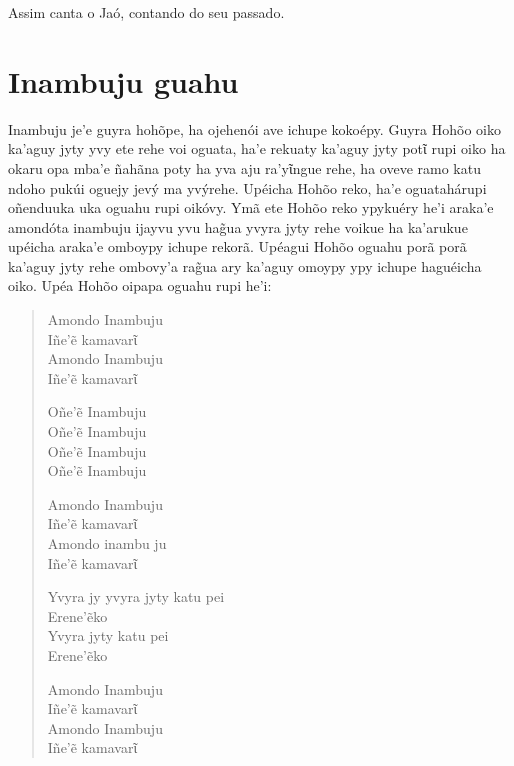 Assim canta o Jaó, contando do seu passado.

\chapter{Inambuju guahu}

Inambuju je'e guyra hohõpe, ha ojehenói ave ichupe kokoépy. Guyra Hohõo
oiko ka'aguy jyty yvy ete rehe voi oguata, ha'e rekuaty ka'aguy jyty
potῖ rupi oiko ha okaru opa mba'e ñahãna poty ha yva aju ra'yῖngue rehe,
ha oveve ramo katu ndoho pukúi oguejy jevý ma yvýrehe. Upéicha Hohõo
reko, ha'e oguatahárupi oñenduuka uka oguahu rupi oikóvy. Ymã ete Hohõo
reko ypykuéry he'i araka'e amondóta inambuju ijayvu yvu hag̃ua yvyra jyty
rehe voikue ha ka'arukue upéicha araka'e omboypy ichupe rekorã. Upéagui
Hohõo oguahu porã porã ka'aguy jyty rehe ombovy'a rag̃ua ary ka'aguy
omoypy ypy ichupe haguéicha oiko. Upéa Hohõo oipapa oguahu rupi he'i:

\begin{verse}
Amondo Inambuju\\
Iñe'ẽ kamavarῖ\footnotemark{}\\
Amondo Inambuju\\
Iñe'ẽ kamavarῖ

Oñe'ẽ Inambuju\footnotemark{}\\
Oñe'ẽ Inambuju\\
Oñe'ẽ Inambuju\\
Oñe'ẽ Inambuju

Amondo Inambuju\\
Iñe'ẽ kamavarῖ\\
Amondo inambu ju\\
Iñe'ẽ kamavarῖ

Yvyra jy yvyra jyty katu pei\\
Erene'ẽko\\
Yvyra jyty katu pei\\
Erene'ẽko

Amondo Inambuju\\
Iñe'ẽ kamavarῖ\\
Amondo Inambuju\\
Iñe'ẽ kamavarῖ
\end{verse}






